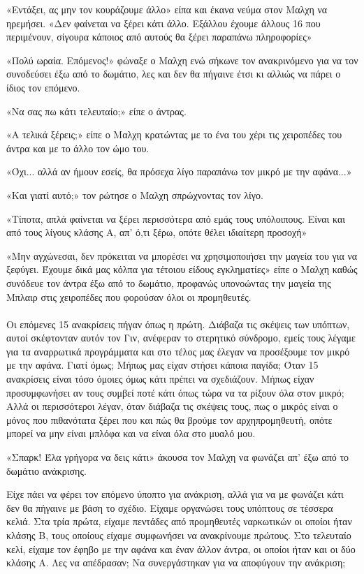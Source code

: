 \documentclass[12pt,twoside, openany]{book}
\begin{document}
«Εντάξει, ας μην τον κουράζουμε άλλο» είπα και έκανα νεύμα στον Μαλχη να ηρεμήσει. «Δεν φαίνεται να ξέρει κάτι άλλο. Εξάλλου έχουμε άλλους 16 που περιμένουν, σίγουρα κάποιος από αυτούς θα ξέρει παραπάνω πληροφορίες»

«Πολύ ωραία. Επόμενος!» φώναξε ο Μαλχη ενώ σήκωνε τον ανακρινόμενο για να τον συνοδεύσει έξω από το δωμάτιο, λες και δεν θα πήγαινε έτσι κι αλλιώς να πάρει ο ίδιος τον επόμενο.

«Να σας πω κάτι τελευταίο;» είπε ο άντρας.

«Α τελικά ξέρεις;» είπε ο Μαλχη κρατώντας με το ένα του χέρι τις χειροπέδες του άντρα και με το άλλο τον ώμο του.

«Όχι... αλλά αν ήμουν εσείς, θα πρόσεχα λίγο παραπάνω τον μικρό με την αφάνα...»

«Και γιατί αυτό;» τον ρώτησε ο Μαλχη σπρώχνοντας τον λίγο.

«Τίποτα, απλά φαίνεται να ξέρει περισσότερα από εμάς τους υπόλοιπους. Είναι και από τους λίγους κλάσης Α, απ’ ό,τι ξέρω, οπότε θέλει ιδιαίτερη προσοχή»

«Μην αγχώνεσαι, δεν πρόκειται να μπορέσει να χρησιμοποιήσει την μαγεία του για να ξεφύγει. Έχουμε δικά μας κόλπα για τέτοιου είδους εγκληματίες» είπε ο Μαλχη καθώς συνόδευε τον άντρα έξω από το δωμάτιο, προφανώς υπονοώντας την μαγεία της Μπλαιρ στις χειροπέδες που φορούσαν όλοι οι προμηθευτές.\\\\

Οι επόμενες 15 ανακρίσεις πήγαν όπως η πρώτη. Διάβαζα τις σκέψεις των υπόπτων, αυτοί σκέφτονταν αυτόν τον Γιν, ανέφεραν το στερητικό σύνδρομο, εμείς τους λέγαμε για τα αναρρωτικά προγράμματα και στο τέλος μας έλεγαν να προσέξουμε τον μικρό με την αφάνα. Γιατί όμως; Μήπως μας είχαν στήσει κάποια παγίδα; Όταν 15 ανακρίσεις είναι τόσο όμοιες όμως κάτι πρέπει να σχεδιάζουν. Μήπως είχαν προσυμφωνήσει αν τους συμβεί ποτέ κάτι όπως τώρα να τα ρίξουν όλα στον μικρό; Αλλά οι περισσότεροι λέγαν, όταν διάβαζα τις σκέψεις τους, πως ο μικρός είναι ο μόνος που πιθανότατα ξέρει που και πώς θα βρούμε τον αρχηπρομηθευτή, οπότε μπορεί να μην είναι μπλόφα και να είναι όλα στο μυαλό μου. 

«Σπαρκ! Έλα γρήγορα να δεις κάτι» άκουσα τον Μαλχη να φωνάζει απ’ έξω από το δωμάτιο ανάκρισης. 

Είχε πάει να φέρει τον επόμενο ύποπτο για ανάκριση, αλλά για να με φωνάζει κάτι δεν θα πήγαινε με βάση το σχέδιο. Είχαμε οργανώσει τους υπόπτους σε τέσσερα κελιά. Στα τρία πρώτα, είχαμε πεντάδες από προμηθευτές ναρκωτικών οι οποίοι ήταν κλάσης Β, τους οποίους είχαμε συμφωνήσει να ανακρίνουμε πρώτους. Στο τελευταίο κελί, είχαμε τον έφηβο με την αφάνα και έναν άλλον άντρα, οι οποίοι ήταν και οι δύο κλάσης Α. Λες να απέδρασαν; Να συνεργάστηκαν για να αποφύγουν την ανάκριση;
\end{document}
